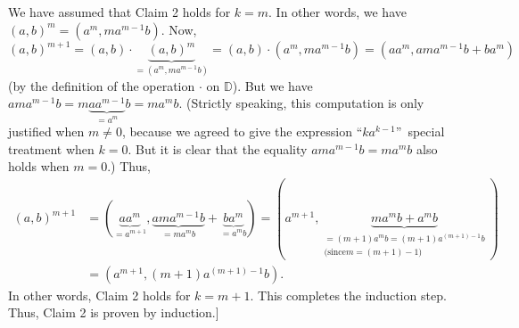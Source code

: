 \documentclass[paper=a4, fontsize=12pt]{scrartcl}%
\theoremstyle{plainsl}
\theoremstyle{definition}
\theoremstyle{remark}
\begin{document}
We have assumed that Claim 2 holds for $k=m$. In other words, we have $\left(
a,b\right)  ^{m}=\left(  a^{m},ma^{m-1}b\right)  $. Now,%
\[
\left(  a,b\right)  ^{m+1}=\left(  a,b\right)  \cdot\underbrace{\left(
a,b\right)  ^{m}}_{=\left(  a^{m},ma^{m-1}b\right)  }=\left(  a,b\right)
\cdot\left(  a^{m},ma^{m-1}b\right)  =\left(  aa^{m},ama^{m-1}b+ba^{m}\right)
\]
(by the definition of the operation $\cdot$ on $\mathbb{D}$). But we have
$ama^{m-1}b=m\underbrace{aa^{m-1}}_{=a^{m}}b=ma^{m}b$. (Strictly speaking,
this computation is only justified when $m\neq0$, because we agreed to give
the expression \textquotedblleft$ka^{k-1}$\textquotedblright\ special
treatment when $k=0$. But it is clear that the equality $ama^{m-1}b=ma^{m}b$
also holds when $m=0$.) Thus,%
\begin{align*}
\left(  a,b\right)  ^{m+1}  &  =\left(  \underbrace{aa^{m}}_{=a^{m+1}%
},\underbrace{ama^{m-1}b}_{=ma^{m}b}+\underbrace{ba^{m}}_{=a^{m}b}\right)
=\left(  a^{m+1},\underbrace{ma^{m}b+a^{m}b}_{\substack{=\left(  m+1\right)
a^{m}b=\left(  m+1\right)  a^{\left(  m+1\right)  -1}b\\\text{(since
}m=\left(  m+1\right)  -1\text{)}}}\right) \\
&  =\left(  a^{m+1},\left(  m+1\right)  a^{\left(  m+1\right)  -1}b\right)  .
\end{align*}
In other words, Claim 2 holds for $k=m+1$. This completes the induction step.
Thus, Claim 2 is proven by induction.]
\end{document}
